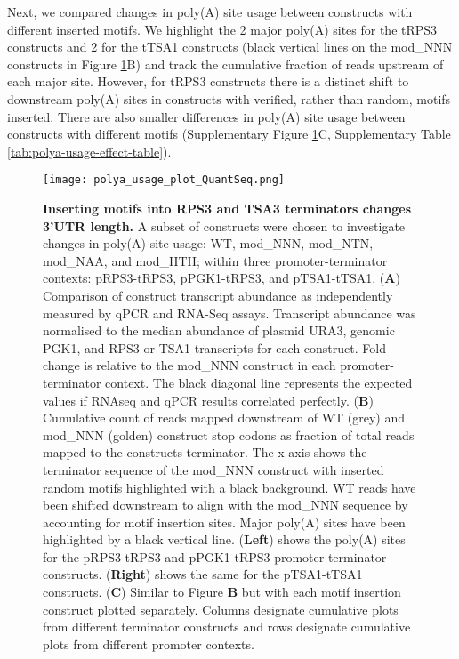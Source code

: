 \documentclass[../main.tex]{subfiles}
\begin{document}
Next, we compared changes in poly(A) site usage between constructs with different inserted motifs.
We highlight the 2 major poly(A) sites for the tRPS3 constructs and 2 for the tTSA1 constructs (black vertical lines on the mod\_NNN constructs in Figure \ref{fig:quantseq-polyA-site-usage}B) and track the cumulative fraction of reads upstream of each major site.
However, for tRPS3 constructs there is a distinct shift to downstream poly(A) sites in constructs with verified, rather than random, motifs inserted.
There are also smaller differences in poly(A) site usage between constructs with different motifs (Supplementary Figure \ref{fig:quantseq-polyA-site-usage}C, Supplementary Table \ref{tab:polya-usage-effect-table}).

\begin{figure}[p]

{\centering \texttt{[image: polya\_usage\_plot\_QuantSeq.png]} 

}

\caption[Inserting motifs into RPS3 and TSA3 terminators changes 3'UTR length.]{\textbf{Inserting motifs into RPS3 and TSA3 terminators changes 3'UTR length.} A subset of constructs were chosen to investigate changes in poly(A) site usage: WT, mod\_NNN, mod\_NTN, mod\_NAA, and mod\_HTH; within three promoter-terminator contexts: pRPS3-tRPS3, pPGK1-tRPS3, and pTSA1-tTSA1. (\textbf{A}) Comparison of construct transcript abundance as independently measured by qPCR and RNA-Seq assays. Transcript abundance was normalised to the median abundance of  plasmid URA3, genomic PGK1, and RPS3 or TSA1 transcripts for each construct. Fold change is relative to the mod\_NNN construct in each promoter-terminator context. The black diagonal line represents the expected values if RNAseq and qPCR results correlated perfectly. (\textbf{B}) Cumulative count of reads mapped downstream of WT (grey) and mod\_NNN (golden) construct stop codons as fraction of total reads mapped to the constructs terminator. The x-axis shows the terminator sequence of the mod\_NNN construct with inserted random motifs highlighted with a black background. WT reads have been shifted downstream to align with the mod\_NNN sequence by accounting for motif insertion sites. Major poly(A) sites have been highlighted by a black vertical line. (\textbf{Left}) shows the poly(A) sites for the pRPS3-tRPS3 and pPGK1-tRPS3 promoter-terminator constructs. (\textbf{Right}) shows the same for the pTSA1-tTSA1 constructs. (\textbf{C}) Similar to Figure \textbf{B} but with each motif insertion construct plotted separately. Columns designate cumulative plots from different terminator constructs and rows designate cumulative plots from different promoter contexts.}\label{fig:quantseq-polyA-site-usage}
\end{figure}
\end{document}
